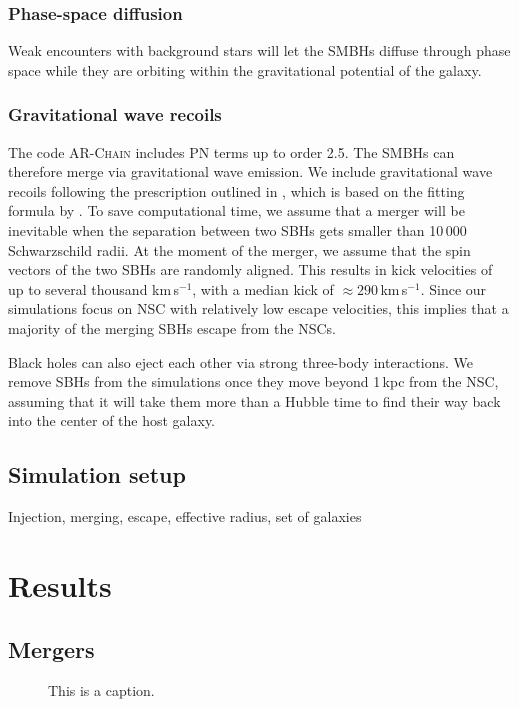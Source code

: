 \documentclass[english, apj]{emulateapj}
\begin{document}
\subsubsection{Phase-space diffusion}
Weak encounters with background stars will let the SMBHs diffuse through phase space while they are orbiting within the gravitational potential of the galaxy.

\subsubsection{Gravitational wave recoils}
The code \textsc{AR-Chain} includes PN terms up to order 2.5. The SMBHs can therefore merge via gravitational wave emission. We include gravitational wave recoils following the prescription outlined in \citet{2015ApJ...799..178K}, which is based on the fitting formula by \citet{2012PhRvD..85h4015L}. To save computational time, we assume that a merger will be inevitable when the separation between two SBHs gets smaller than 10\,000 Schwarzschild radii. At the moment of the merger, we assume that the spin vectors of the two SBHs are randomly aligned. This results in kick velocities of up to several thousand km\,s$^{-1}$, with a median kick of $\approx 290$\,km\,s$^{-1}$. Since our simulations focus on NSC with relatively low escape velocities, this implies that a majority of the merging SBHs escape from the NSCs. 

Black holes can also eject each other via strong three-body interactions. We remove SBHs from the simulations once they move beyond 1\,kpc from the NSC, assuming that it will take them more than a Hubble time to find their way back into the center of the host galaxy.


\subsection{Simulation setup}
Injection, merging, escape, effective radius, set of galaxies


\section{Results}\label{sec:results}

\subsection{Mergers}

\begin{figure}
\centering
\caption{This is a caption.}
\label{this_is_a_label}
\end{figure}
\end{document}

